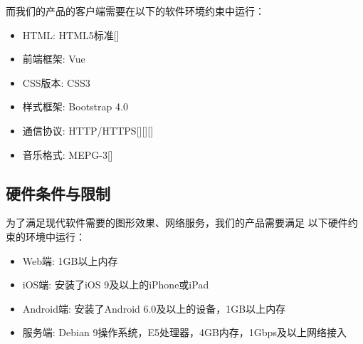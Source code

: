     而我们的产品的客户端需要在以下的软件环境约束中运行：
    \begin{itemize}
    \item HTML: HTML5标准[\cite{hickson2011html5}]
    \item 前端框架: Vue
    \item CSS版本: CSS3
    \item 样式框架: Bootstrap 4.0
    \item 通信协议: HTTP/HTTPS[\cite{berners1996hypertext}][\cite{fielding1999hypertext}][\cite{rescorla2000http}]
    \item 音乐格式: MEPG-3[\cite{le1991mpeg}]
\end{itemize}

\subsection{硬件条件与限制} %

        为了满足现代软件需要的图形效果、网络服务，我们的产品需要满足
        以下硬件约束的环境中运行：
        \begin{itemize}
            \item Web端: 1GB以上内存
            \item iOS端: 安装了iOS 9及以上的iPhone或iPad
            \item Android端: 安装了Android 6.0及以上的设备，1GB以上内存
            \item 服务端: Debian 9操作系统，E5处理器，4GB内存，1Gbps及以上网络接入
        \end{itemize}

